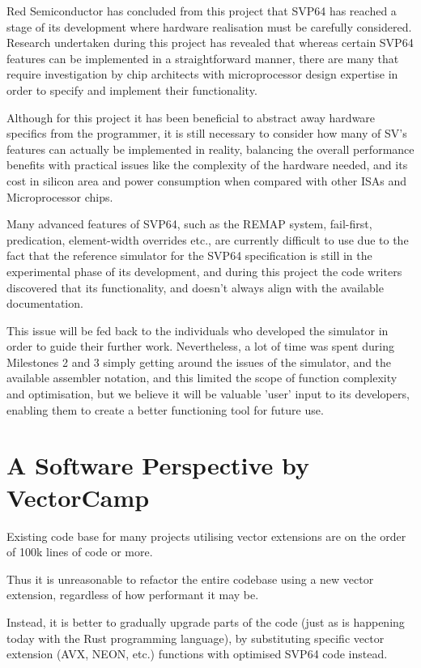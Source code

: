 Red Semiconductor has concluded from this project that SVP64 has reached a
stage of its development where hardware realisation must be carefully
considered. Research undertaken during this project has revealed that whereas
certain SVP64 features can be implemented in a straightforward manner, there
are many that require investigation by chip architects with microprocessor
design expertise in order to specify and implement their functionality.

Although for this project it has been beneficial to abstract away hardware
specifics from the programmer, it is still necessary to consider how many of
\acrshort{SV}'s features can actually be implemented in reality,
balancing the overall performance benefits with practical issues like the
complexity of the hardware needed, and its cost in silicon area and power
consumption when compared with other ISAs and Microprocessor chips.

Many advanced features of SVP64, such as the REMAP system, fail-first,
predication, element-width overrides etc., are currently difficult to use
due to the fact that the reference simulator for the SVP64 specification is
still in the experimental phase of its development, and during this project the
code writers discovered that its functionality, and doesn't always align with
the available documentation.

This issue will be fed back to the individuals who developed the simulator in
order to guide their further work. Nevertheless, a lot of time was spent
during Milestones 2 and 3 simply getting around the issues of the simulator,
and the available assembler notation, and this limited the scope of function
complexity and optimisation, but we believe it will be valuable 'user' input
to its developers, enabling them to create a better functioning tool
for future use.

\section{A Software Perspective by VectorCamp}
\label{sec:vecotorscansoftwareperspective}

Existing code base for many projects utilising vector extensions are on the
order of 100k lines of code or more.

Thus it is unreasonable to refactor the entire codebase using a new vector
extension, regardless of how performant it may be.

Instead, it is better to gradually upgrade parts of the code (just as is
happening today with the Rust programming language), by substituting specific
vector extension (AVX, NEON, etc.) functions with optimised SVP64 code instead.

